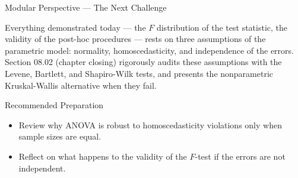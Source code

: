 \documentclass[10pt, aspectratio=169]{beamer}
\begin{document}
\begin{frame}{Modular Perspective --- The Next Challenge}
  \scriptsize
  \begin{retoclase}
    Everything demonstrated today --- the $F$ distribution of the test statistic, the validity of the post-hoc procedures --- rests on three assumptions of the parametric model: normality, homoscedasticity, and independence of the errors. Section 08.02 (chapter closing) rigorously audits these assumptions with the Levene, Bartlett, and Shapiro-Wilk tests, and presents the nonparametric Kruskal-Wallis alternative when they fail.
  \end{retoclase}

  \vspace{0.08cm}
  \pause
  \begin{alertblock}{Recommended Preparation}
    \begin{itemize}\itemsep=0.06cm
      \item Review why ANOVA is robust to homoscedasticity violations only when sample sizes are equal.
      \item Reflect on what happens to the validity of the $F$-test if the errors are not independent.
    \end{itemize}
  \end{alertblock}
\end{frame}
\end{document}
